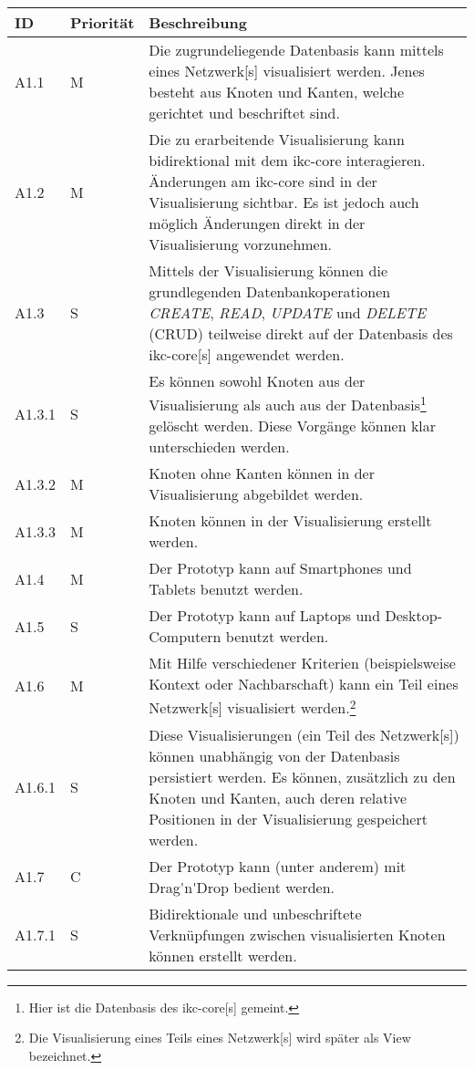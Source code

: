 \begin{longtable}{|p{1.5cm} | p{1.5cm} | p{8.1cm}|}
  \hline
    ID & Priorität & Beschreibung \\\hline
    A1.1 & M & Die zugrundeliegende Datenbasis kann mittels eines \gls{Netzwerk}[s] visualisiert werden. Jenes besteht aus Knoten und Kanten, welche gerichtet und beschriftet sind.\\\hline
    A1.2 & M & Die zu erarbeitende Visualisierung kann bidirektional mit dem \gls{ikc-core} interagieren. Änderungen am \gls{ikc-core} sind in der Visualisierung sichtbar. Es ist jedoch auch möglich Änderungen direkt in der Visualisierung vorzunehmen.\\\hline
    A1.3 & S & Mittels der Visualisierung können die grundlegenden Datenbankoperationen \textit{CREATE}, \textit{READ}, \textit{UPDATE} und \textit{DELETE} (CRUD) teilweise direkt auf der Datenbasis des \gls{ikc-core}[s] angewendet werden.\\\hline
    A1.3.1 & S & Es können sowohl Knoten aus der Visualisierung als auch aus der Datenbasis\footnote{Hier ist die Datenbasis des \gls{ikc-core}[s] gemeint.} gelöscht werden. Diese Vorgänge können klar unterschieden werden.\\\hline
    A1.3.2 & M & Knoten ohne Kanten können in der Visualisierung abgebildet werden.\\\hline
    A1.3.3 & M & Knoten können in der Visualisierung erstellt werden.\\\hline
    A1.4 & M & Der Prototyp kann auf Smartphones und Tablets benutzt werden.\\\hline
    A1.5 & S & Der Prototyp kann auf Laptops und Desktop-Computern benutzt werden.\\\hline    
    A1.6 & M & Mit Hilfe verschiedener Kriterien (beispielsweise Kontext oder Nachbarschaft) kann ein Teil eines \gls{Netzwerk}[s] visualisiert werden.\footnote{Die Visualisierung eines Teils eines \gls{Netzwerk}[s]  wird später als \gls{View} bezeichnet.}\\\hline 
    A1.6.1 & S & Diese Visualisierungen (ein Teil des \gls{Netzwerk}[s]) können unabhängig von der Datenbasis persistiert werden. Es können, zusätzlich zu den Knoten und Kanten, auch deren relative Positionen in der Visualisierung gespeichert werden.\\\hline 
    A1.7 & C & Der Prototyp kann (unter anderem) mit \gls{Drag'n'Drop} bedient werden.\\\hline
    A1.7.1 & S & Bidirektionale und unbeschriftete Verknüpfungen zwischen visualisierten Knoten können erstellt werden.\\\hline

\end{longtable}
